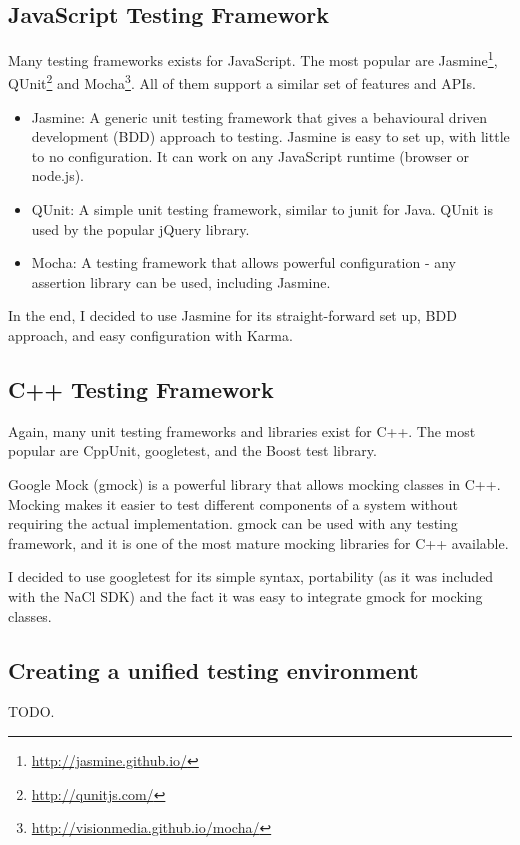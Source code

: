
\subsection{JavaScript Testing Framework} %
\label{sub:js_test_framework}
Many testing frameworks exists for JavaScript. The most popular are Jasmine\footnote{\url{http://jasmine.github.io/}}, QUnit\footnote{\url{http://qunitjs.com/}} and Mocha\footnote{\url{http://visionmedia.github.io/mocha/}}. All of them support a similar set of features and APIs. 

\begin{itemize}
	\item Jasmine: A generic unit testing framework that gives a behavioural driven development (BDD) approach to testing. Jasmine is easy to set up, with little to no configuration. It can work on any JavaScript runtime (browser or node.js).
	\item QUnit: A simple unit testing framework, similar to junit for Java. QUnit is used by the popular jQuery library. 
	\item Mocha: A testing framework that allows powerful configuration - any assertion library can be used, including Jasmine.
\end{itemize}

In the end, I decided to use Jasmine for its straight-forward set up, BDD approach, and easy configuration with Karma.


\subsection{C++ Testing Framework} %
\label{sub:cpp_testing}
Again, many unit testing frameworks and libraries exist for C++. The most popular are CppUnit, googletest, and the Boost test library.

Google Mock (gmock) is a powerful library that allows mocking classes in C++. Mocking makes it easier to test different components of a system without requiring the actual implementation. gmock can be used with any testing framework, and it is one of the most mature mocking libraries for C++ available.

I decided to use googletest for its simple syntax, portability (as it was included with the NaCl SDK) and the fact it was easy to integrate gmock for mocking classes.


\subsection{Creating a unified testing environment} %
\label{sub:creating_a_testing_framework}
TODO.
